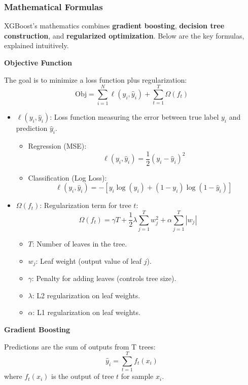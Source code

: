 \subsubsection{Mathematical Formulas}

XGBoost's mathematics combines \textbf{gradient boosting}, \textbf{decision tree construction}, and \textbf{regularized optimization}.
Below are the key formulas, explained intuitively.

\smallskip
\textbf{Objective Function}

The goal is to minimize a loss function plus regularization:
\[\text{Obj} = \sum_{i=1}^N \ell(y_i, \hat{y}_i) + \sum_{t=1}^T \Omega(f_t)\]

\begin{itemize}
    \item $\ell(y_i, \hat{y}_i)$: Loss function measuring the error between true label $y_i$ and prediction $\hat{y}_i$.
    \begin{itemize}
        \item Regression (MSE):
        \[
            \ell(y_i, \hat{y}_i) = \frac{1}{2}(y_i - \hat{y}_i)^2
        \]
        \item Classification (Log Loss):
        \[
            \ell(y_i, \hat{y}_i) = -[y_i \log(\hat{y}_i) + (1 - y_i) \log(1 - \hat{y}_i)]
        \]
    \end{itemize}

    \item $\Omega(f_t)$: Regularization term for tree $t$:
    \[
        \Omega(f_t) = \gamma T + \frac{1}{2}\lambda \sum_{j=1}^T w_j^2 + \alpha \sum_{j=1}^T |w_j|
    \]
    \begin{itemize}
        \item $T$: Number of leaves in the tree.
        \item $w_j$: Leaf weight (output value of leaf $j$).
        \item $\gamma$: Penalty for adding leaves (controls tree size).
        \item $\lambda$: L2 regularization on leaf weights.
        \item $\alpha$: L1 regularization on leaf weights.
    \end{itemize}
\end{itemize}

\smallskip
\textbf{Gradient Boosting}

Predictions are the sum of outputs from T trees:
\[
    \hat{y}_i = \sum_{t=1}^T f_t(x_i)
\]
where $f_t(x_i)$ is the output of tree $t$ for sample $x_i$.

